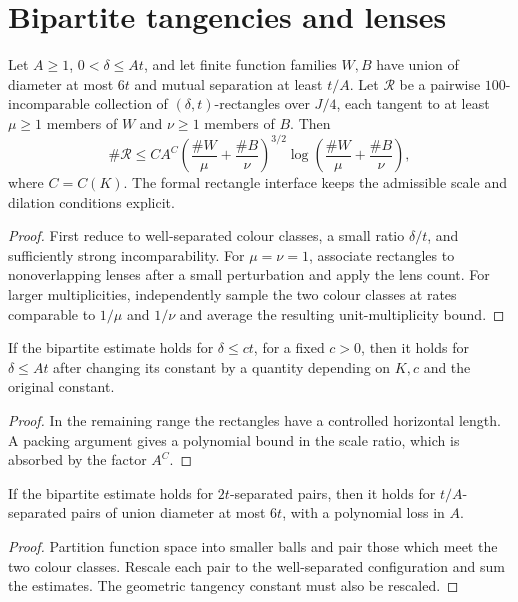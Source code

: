 \section{Bipartite tangencies and lenses}

\begin{proposition}
\label{prop:bipartite-tangency}
Let $A\geq1$, $0<\delta\leq At$, and let finite function
families $W,B$ have union of diameter at most $6t$ and mutual
separation at least $t/A$. Let $\mathcal R$ be a pairwise
$100$-incomparable collection of $(\delta,t)$-rectangles over
$J/4$, each tangent to at least $\mu\geq1$ members of $W$
and $\nu\geq1$ members of $B$. Then
\[
 \#\mathcal R\leq CA^C
       \left(\frac{\#W}{\mu}+\frac{\#B}{\nu}\right)^{3/2}
       \log\left(\frac{\#W}{\mu}+\frac{\#B}{\nu}\right),
\]
where $C=C(K)$. The formal rectangle interface keeps the
admissible scale and dilation conditions explicit.
\end{proposition}
\begin{proof}
First reduce to well-separated colour classes, a small ratio
$\delta/t$, and sufficiently strong incomparability. For
$\mu=\nu=1$, associate rectangles to nonoverlapping lenses
after a small perturbation and apply the lens count. For
larger multiplicities, independently sample the two colour
classes at rates comparable to $1/\mu$ and $1/\nu$ and
average the resulting unit-multiplicity bound.
\end{proof}

\begin{lemma}
\label{lem:large-delta-reduction}
If the bipartite estimate holds for $\delta\leq ct$, for
a fixed $c>0$, then it holds for $\delta\leq At$ after
changing its constant by a quantity depending on $K,c$ and
the original constant.
\end{lemma}
\begin{proof}
In the remaining range the rectangles have a controlled
horizontal length. A packing argument gives a polynomial
bound in the scale ratio, which is absorbed by the factor
$A^C$.
\end{proof}

\begin{lemma}
\label{lem:separation-reduction}
If the bipartite estimate holds for $2t$-separated pairs,
then it holds for $t/A$-separated pairs of union diameter
at most $6t$, with a polynomial loss in $A$.
\end{lemma}
\begin{proof}
Partition function space into smaller balls and pair those
which meet the two colour classes. Rescale each pair to the
well-separated configuration and sum the estimates. The
geometric tangency constant must also be rescaled.
\end{proof}

